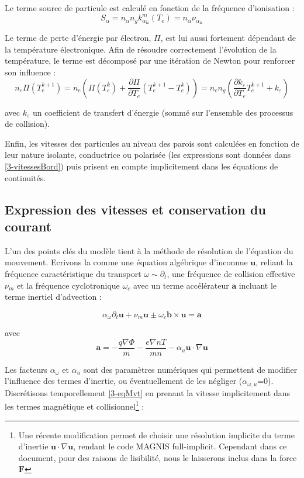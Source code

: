\begin{refsection}
Le terme source de particule est calculé en fonction de la fréquence
d'ionisation :
\begin{equation*}
S_{\alpha}=n_\alpha n_g k^m_{\alpha_\text{iz}}(T_e)=n_\alpha\nu_{\alpha_\text{iz}}
\end{equation*}

Le terme de perte d'énergie par électron, $\Pi$, est lui aussi fortement
dépendant de la température électronique. Afin de résoudre correctement
l'évolution de la température, le terme est décomposé par une itération
de Newton pour renforcer son influence :
\begin{equation*}
n_e\Pi(T_e^{k+1})=n_e\left(\Pi(T_e^{k})+\frac{\partial\Pi}{\partial
T_e}\left(T_e^{k+1}-T_e^{k}\right)\right)= n_en_g\left(
\frac{\partial k_{\varepsilon}}{\partial T_e}T_e^{k+1}+k_{\varepsilon}\right)
\end{equation*}

avec $k_\varepsilon$ un coefficient de transfert d'énergie (sommé sur 
l'ensemble des processus de collision).

Enfin, les vitesses des particules au niveau des parois sont calculées en
fonction de leur nature isolante, conductrice ou polarisée (les expressions
sont données dans \ref{3-vitessesBord}) puis prisent en compte implicitement
dans les équations de continuités.

\subsection{Expression des vitesses et conservation du courant}
L'un des points clés du modèle tient à la méthode de résolution de l'équation du
mouvement. Ecrivons la comme une équation algébrique
d'inconnue $\mathbf u$, reliant la fréquence caractéristique du transport
$\omega\sim\partial_t$, une fréquence de collision effective $\nu_m$ et la
fréquence cyclotronique $\omega_c$ avec un terme
accélérateur $\mathbf a$ incluant le terme inertiel d'advection :

\begin{equation}
\label{3-eqMvt}
\alpha_\omega\partial_t \mathbf{u} + 
\nu_m\mathbf{u}\pm\omega_{c}\mathbf{b}\times\mathbf{u}=
\mathbf a
\end{equation}

avec 
\begin{equation*}\mathbf a=
-\frac{q\nabla \Phi}{m}-\frac{e\nabla
n T}{m
n}-\alpha_u\mathbf{u}\cdot\nabla\mathbf{u}
\end{equation*}

Les facteurs $\alpha_\omega$ et $\alpha_u$ sont des paramètres numériques qui
permettent de modifier l'influence des termes d'inertie, ou éventuellement de
les négliger ($\alpha_{\omega,u}$=0). Discrétisons temporellement
\eqref{3-eqMvt} en prenant la vitesse implicitement dans les termes
magnétique et collisionnel\footnote{Une récente modification permet de choisir
une résolution implicite du terme
d'inertie $\mathbf{u}\cdot\nabla\mathbf{u}$, rendant le code MAGNIS
full-implicit. Cependant dans ce document, pour des raisons de lisibilité, nous
le laisserons inclus dans la force $\mathbf F$} :


\end{refsection}

